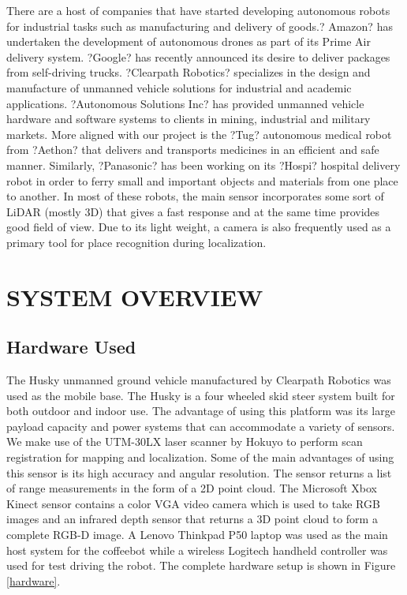 \documentclass[letterpaper, 10 pt, conference]{ieeeconf}  %
\begin{document}
There are a host of companies that have started developing autonomous robots for industrial tasks such as manufacturing and delivery of goods.? Amazon? has undertaken the development of autonomous drones as part of its Prime Air delivery system. ?Google? has recently announced its desire to deliver packages from self-driving trucks. ?Clearpath Robotics? specializes in the design and manufacture of unmanned vehicle solutions for industrial and academic applications. ?Autonomous Solutions Inc? has provided unmanned vehicle hardware and software systems to clients in mining, industrial and military markets. More aligned with our project is the ?Tug? autonomous medical robot from ?Aethon? that delivers and transports medicines in an efficient and safe manner. Similarly, ?Panasonic? has been working on its ?Hospi? hospital delivery robot in order to ferry small and important objects and materials from one place to another. In most of these robots, the main sensor incorporates some sort of LiDAR (mostly 3D) that gives a fast response and at the same time provides good field of view. Due to its light weight, a camera is also frequently used as a primary tool for place recognition during localization.

\section{SYSTEM OVERVIEW}

\subsection{Hardware Used} 

The Husky unmanned ground vehicle manufactured by Clearpath Robotics was used as the mobile base. The Husky is a four wheeled skid steer system built for both outdoor and indoor use. The advantage of using this platform was its large payload capacity and power systems that can accommodate a variety of sensors. We make use of the UTM-30LX laser scanner by Hokuyo to perform scan registration for mapping and localization. Some of the main advantages of using this sensor is its high accuracy and angular resolution. The sensor returns a list of range measurements in the form of a 2D point cloud. The Microsoft Xbox Kinect sensor contains a color VGA video camera which is used to take RGB images and an infrared depth sensor that returns a 3D point cloud to form a complete RGB-D image. A Lenovo Thinkpad P50 laptop was used as the main host system for the coffeebot while a wireless Logitech handheld controller was used for test driving the robot. The complete hardware setup is shown in Figure \ref{hardware}. 
\end{document}

